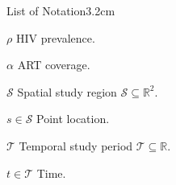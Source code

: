 \begin{mclistof}{List of Notation}{3.2cm}

\item[$\rho$] HIV prevalence.
\item[$\alpha$] ART coverage.
\item[$\mathcal{S}$] Spatial study region $\mathcal{S} \subseteq \mathbb{R}^2$.
\item[$s \in \mathcal{S}$] Point location.
\item[$\mathcal{T}$] Temporal study period $\mathcal{T} \subseteq \mathbb{R}$.
\item[$t \in \mathcal{T}$] Time. 

\end{mclistof} 